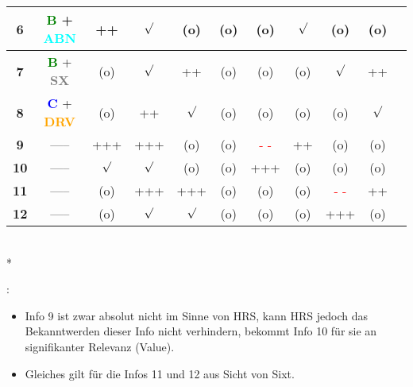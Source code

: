 \begin{Example}
\begin{tabular}[h]{|c|c|c|c|c|c|c|c|c|c|c}
\hline
\textbf{6} & \textcolor{green}{\textbf{B}} + \textcolor{cyan}{\textbf{ABN}} & \textcolor{dunkelgruen}{++} & $\surd$ & (o) & (o) & (o) & $\surd$ & (o) & (o) \\
\hline
\textbf{7} & \textcolor{green}{\textbf{B}} + \textcolor{gray}{\textbf{SX}} & (o) & $\surd$ & \textcolor{dunkelgruen}{++} & (o) & (o) & (o) & $\surd$ & \textcolor{dunkelgruen}{++} \\
\hline
\textbf{8} & \textcolor{blue}{\textbf{C}} + \textcolor{orange}{\textbf{DRV}} & (o) & \textcolor{dunkelgruen}{++} & $\surd$ & (o) & (o) & (o) & (o) & $\surd$ \\
\hline
\textbf{9} & ----- & \textcolor{dunkelgruen}{+++} & \textcolor{dunkelgruen}{+++} & (o) & (o) & \textcolor{red}{- -} & \textcolor{dunkelgruen}{++} & (o) & (o) \\
\hline
\textbf{10} & ----- & $\surd$ & $\surd$ & (o) & (o) & \textcolor{dunkelgruen}{+++} & (o) & (o) & (o) \\
\hline
\textbf{11} & ----- & (o) & \textcolor{dunkelgruen}{+++} & \textcolor{dunkelgruen}{+++} & (o) & (o) & (o) & \textcolor{red}{- -} & \textcolor{dunkelgruen}{++} \\
\hline
\textbf{12} & ----- & (o) & $\surd$ & $\surd$ & (o) & (o) & (o) & \textcolor{dunkelgruen}{+++} & (o) \\
\hline
\end{tabular}\vspace*{0.3cm}\\*

\vspace{0.2cm}

:

\begin{itemize}
  \item Info 9 ist zwar absolut nicht im Sinne von HRS, kann HRS jedoch das Bekanntwerden dieser Info nicht verhindern, bekommt Info 10 für sie an signifikanter Relevanz (Value).
  \item Gleiches gilt für die Infos 11 und 12 aus Sicht von Sixt. 
\end{itemize}

\vspace{0.2cm}

\end{Example}

\vspace{0.3cm}


